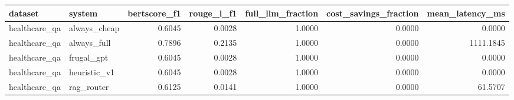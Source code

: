 \begin{tabular}{llrrrrr}
\toprule
dataset & system & bertscore_f1 & rouge_l_f1 & full_llm_fraction & cost_savings_fraction & mean_latency_ms \\
\midrule
healthcare_qa & always_cheap & 0.6045 & 0.0028 & 1.0000 & 0.0000 & 0.0000 \\
healthcare_qa & always_full & 0.7896 & 0.2135 & 1.0000 & 0.0000 & 1111.1845 \\
healthcare_qa & frugal_gpt & 0.6045 & 0.0028 & 1.0000 & 0.0000 & 0.0000 \\
healthcare_qa & heuristic_v1 & 0.6045 & 0.0028 & 1.0000 & 0.0000 & 0.0000 \\
healthcare_qa & rag_router & 0.6125 & 0.0141 & 1.0000 & 0.0000 & 61.5707 \\
\bottomrule
\end{tabular}
